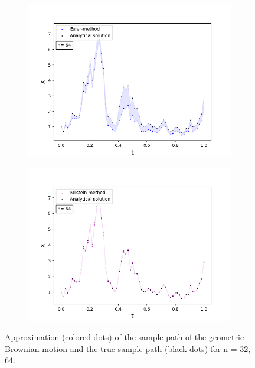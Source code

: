 \begin{figure}[!h]
\begin{subfigure}{0.49\linewidth}
     \includegraphics[scale=0.4]{Content/Graphics/SDE_EulerGBM_n_64}
   \end{subfigure}
   \begin{subfigure}{0.49\linewidth} \centering
     \includegraphics[scale=0.4]{Content/Graphics/SDE_MilsteinGBM_n_64}
   \end{subfigure}
\caption{Approximation (colored dots) of the sample path of the geometric Brownian motion and the true sample path (black dots) for n = 32, 64.}
\end{figure}


